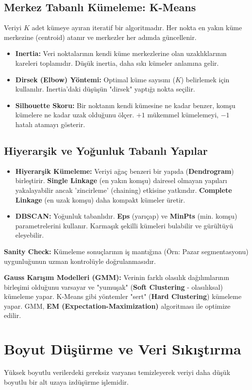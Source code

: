 \documentclass[12pt,a4paper]{article}
\begin{document}
\subsection{Merkez Tabanlı Kümeleme: K-Means}
Veriyi $K$ adet kümeye ayıran iteratif bir algoritmadır. Her nokta en yakın küme merkezine (centroid) atanır ve merkezler her adımda güncellenir.
\begin{itemize}
    \item \textbf{Inertia:} Veri noktalarının kendi küme merkezlerine olan uzaklıklarının kareleri toplamıdır. Düşük inertia, daha sıkı kümeler anlamına gelir.
    \item \textbf{Dirsek (Elbow) Yöntemi:} Optimal küme sayısını ($K$) belirlemek için kullanılır. Inertia'daki düşüşün "dirsek" yaptığı nokta seçilir.
    \item \textbf{Silhouette Skoru:} Bir noktanın kendi kümesine ne kadar benzer, komşu kümelere ne kadar uzak olduğunu ölçer. $+1$ mükemmel kümelemeyi, $-1$ hatalı atamayı gösterir.
\end{itemize}

\subsection{Hiyerarşik ve Yoğunluk Tabanlı Yapılar}
\begin{itemize}
    \item \textbf{Hiyerarşik Kümeleme:} Veriyi ağaç benzeri bir yapıda (\textbf{Dendrogram}) birleştirir. \textbf{Single Linkage} (en yakın komşu) dairesel olmayan yapıları yakalayabilir ancak 'zincirleme' (chaining) etkisine yatkındır. \textbf{Complete Linkage} (en uzak komşu) daha kompakt kümeler üretir.
    \item \textbf{DBSCAN:} Yoğunluk tabanlıdır. \textbf{Eps} (yarıçap) ve \textbf{MinPts} (min. komşu) parametrelerini kullanır. Karmaşık şekilli kümeleri bulabilir ve gürültüyü eleyebilir.
\end{itemize}
\textbf{Sanity Check:} Kümeleme sonuçlarının iş mantığına (Örn: Pazar segmentasyonu) uygunluğunun uzman kontrolüyle doğrulanmasıdır.

\textbf{Gauss Karışım Modelleri (GMM):} Verinin farklı olasılık dağılımlarının birleşimi olduğunu varsayar ve "yumuşak" (\textbf{Soft Clustering} - olasılıksal) kümeleme yapar. K-Means gibi yöntemler "sert" (\textbf{Hard Clustering}) kümeleme yapar. GMM, \textbf{EM (Expectation-Maximization)} algoritması ile optimize edilir.

\newpage
\section{Boyut Düşürme ve Veri Sıkıştırma}
Yüksek boyutlu verilerdeki gereksiz varyansı temizleyerek veriyi daha düşük boyutlu bir alt uzaya izdüşürme işlemidir.
\end{document}
